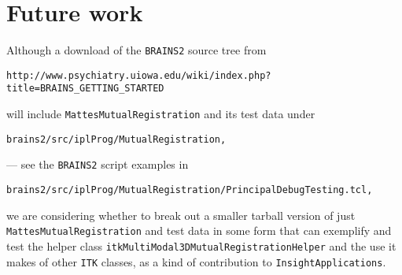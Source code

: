 \documentclass [10pt,twocolumn,twoside,final,letterpaper]{report}
\newcommand{\bcode}{\texttt}
\newcommand{\brainstwoprog}{\bcode{BRAINS2}}
\newcommand{\miregprog}{\bcode{MattesMutualRegistration}}
\begin{document}
\section{Future work} \label{sec:futurework}
Although a download of the \brainstwoprog{} source tree from
\begin{verbatim}
http://www.psychiatry.uiowa.edu/wiki/index.php?title=BRAINS_GETTING_STARTED
\end{verbatim}
will include \miregprog{} and its test data under
\begin{verbatim}
brains2/src/iplProg/MutualRegistration,
\end{verbatim}
--- see the \brainstwoprog{} script examples in
\begin{verbatim}
brains2/src/iplProg/MutualRegistration/PrincipalDebugTesting.tcl,
\end{verbatim}
we are considering whether to break out a smaller tarball version
of just \miregprog{} and test data in some form that can exemplify
and test the helper class \bcode{itkMultiModal3DMutualRegistrationHelper}
and the use it makes of other \bcode{ITK} classes,
as a kind of contribution to \bcode{InsightApplications}.

\appendix
\end{document}
